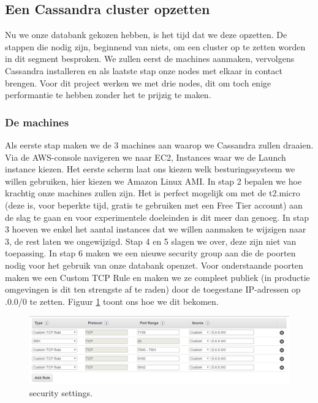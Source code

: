 	\subsection{Een Cassandra cluster opzetten}
	Nu we onze databank gekozen hebben, is het tijd dat we deze opzetten. 
	De stappen die nodig zijn, beginnend van niets, om een cluster op te zetten worden in dit segment besproken. 
	We zullen eerst de machines aanmaken, vervolgens Cassandra installeren en als laatste stap onze nodes met elkaar in contact brengen.
	Voor dit project werken we met drie nodes, dit om toch enige performantie te hebben zonder het te prijzig te maken.
	\subsubsection{De machines}
	Als eerste stap maken we de 3 machines aan waarop we Cassandra zullen draaien. 
	Via de AWS-console navigeren we naar EC2, Instances waar we de \textquotedbl Launch instance\textquotedbl{} kiezen.
	Het eerste scherm laat ons kiezen welk besturingssysteem we willen gebruiken, hier kiezen we Amazon Linux AMI. 
	In stap 2 bepalen we hoe krachtig onze machines zullen zijn. Het is perfect mogelijk om met de t2.micro 
	(deze is, voor beperkte tijd, gratis te gebruiken met een \textquotedbl Free Tier\textquotedbl{} account) aan de slag te gaan en voor experimentele doeleinden is dit meer dan genoeg.
	In stap 3 hoeven we enkel het aantal instances dat we willen aanmaken te wijzigen naar 3, 
	de rest laten we ongewijzigd. Stap 4 en 5 slagen we over, deze zijn niet van toepassing. 
	In stap 6 maken we een nieuwe security group aan die de poorten nodig voor het gebruik van onze databank openzet. 
	Voor onderstaande poorten maken we een \textquotedbl Custom TCP Rule\textquotedbl{} en maken we ze compleet publiek (in productie omgevingen is 
	dit ten strengste af te raden) door de toegestane IP-adressen op .0.0/0\textquotedbl{} te zetten. Figuur \ref{fig:security-settings} toont ons hoe we dit bekomen.
	
	
	
	\begin{figure}[h!]
  		\includegraphics[width=\linewidth]{images/inbound-rules-cassandra.PNG}
  		\caption{security settings.}
  		\label{fig:security-settings}
	\end{figure}
	
